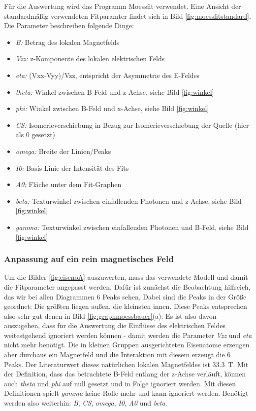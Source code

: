 \documentclass[german, %
parskip=full, %
bibliography=totoc, %
]{scrartcl}
\begin{document}
Für die Auswertung wird das Programm Moessfit verwendet. Eine Ansicht der standardmäßig verwendeten Fitparamter findet sich in Bild \ref{fig:moessfitstandard}. Die Parameter beschreiben folgende Dinge:
\begin{itemize}
\item \textit{B:} Betrag des lokalen Magnetfelds
\item \textit{Vzz:} z-Komponente des lokalen elektrischen Felds
\item \textit{eta:} (Vxx-Vyy)/Vzz, entspricht der Asymmetrie des E-Feldes
\item \textit{theta:} Winkel zwischen B-Feld und z-Achse, siehe Bild \ref{fig:winkel}
\item \textit{phi:} Winkel zwischen B-Feld und x-Achse, siehe Bild \ref{fig:winkel}
\item \textit{CS:} Isomerieverschiebung in Bezug zur Isomerieverschiebung der Quelle (hier als 0 gesetzt)
\item \textit{omega:} Breite der Linien/Peaks
\item \textit{I0:} Basis-Linie der Intensität des Fits
\item \textit{A0:} Fläche unter dem Fit-Graphen
\item \textit{beta:} Texturwinkel zwischen einfallenden Photonen und z-Achse, siehe Bild \ref{fig:winkel}
\item \textit{gamma:} Texturwinkel zwischen einfallenden Photonen und B-Feld, siehe Bild \ref{fig:winkel}
\end{itemize}

\subsubsection{Anpassung auf ein rein magnetisches Feld}

Um die Bilder \ref{fig:eisenoA} auszuwerten, muss das verwendete Modell und damit die Fitparameter angepasst werden. Dafür ist zunächst die Beobachtung hilfreich, das wir bei allen Diagrammen 6 Peaks sehen. Dabei sind die Peaks in der Größe geordnet: Die größten liegen außen, die kleinsten innen. Diese Peaks entsprechen also sehr gut denen in Bild \ref{fig:graphmoessbauer}(a). Es ist also davon auszugehen, dass für die Auswertung die Einflüsse des elektrischen Feldes weitestgehend ignoriert werden können - damit werden die Parameter \textit{Vzz} und \textit{eta} nicht mehr benötigt. Die in kleinen Gruppen ausgerichteten Eisenatome erzeugen aber durchaus ein Magnetfeld und die Interaktion mit diesem erzeugt die 6 Peaks. Der Literaturwert dieses natürlichen lokalen Magnetfeldes ist \SI{33.3}{\tesla}. Mit der Definition, dass das betrachtete B-Feld entlang der z-Achse verläuft, können auch \textit{theta} und \textit{phi} auf null gesetzt und in Folge ignoriert werden. Mit diesen Definitionen spielt \textit{gamma} keine Rolle mehr und kann ignoriert werden. Benötigt werden also weiterhin: \textit{B}, \textit{CS}, \textit{omega}, \textit{I0}, \textit{A0} und \textit{beta}. 
\end{document}
